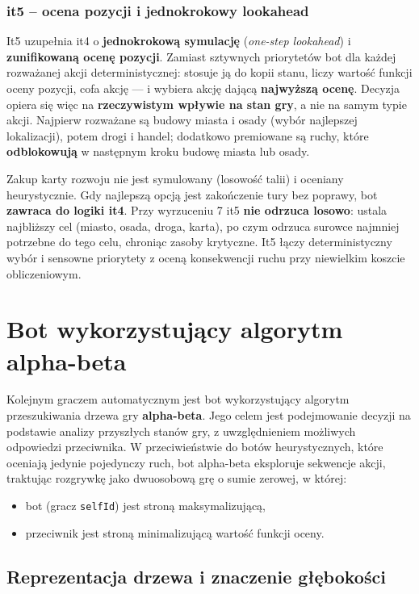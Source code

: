 \documentclass[polish,inz,longabstract]{iithesis}
\begin{document}
\subsubsection{it5 -- ocena pozycji i jednokrokowy lookahead}

It5 uzupełnia it4 o \textbf{jednokrokową symulację} (\emph{one-step lookahead}) i \textbf{zunifikowaną ocenę pozycji}. Zamiast sztywnych priorytetów bot dla każdej rozważanej akcji deterministycznej: stosuje ją do kopii stanu, liczy wartość funkcji oceny pozycji, cofa akcję --- i wybiera akcję dającą \textbf{najwyższą ocenę}. Decyzja opiera się więc na \textbf{rzeczywistym wpływie na stan gry}, a nie na samym typie akcji. Najpierw rozważane są budowy miasta i osady (wybór najlepszej lokalizacji), potem drogi i handel; dodatkowo premiowane są ruchy, które \textbf{odblokowują} w następnym kroku budowę miasta lub osady.

Zakup karty rozwoju nie jest symulowany (losowość talii) i oceniany heurystycznie. Gdy najlepszą opcją jest zakończenie tury bez poprawy, bot \textbf{zawraca do logiki it4}. Przy wyrzuceniu 7 it5 \textbf{nie odrzuca losowo}: ustala najbliższy cel (miasto, osada, droga, karta), po czym odrzuca surowce najmniej potrzebne do tego celu, chroniąc zasoby krytyczne. It5 łączy deterministyczny wybór i sensowne priorytety z oceną konsekwencji ruchu przy niewielkim koszcie obliczeniowym.

\section{Bot wykorzystujący algorytm alpha-beta}
\label{sec:alphabeta}

Kolejnym graczem automatycznym jest bot wykorzystujący algorytm przeszukiwania drzewa gry \textbf{alpha-beta}. Jego celem jest podejmowanie decyzji na podstawie analizy przyszłych stanów gry, z uwzględnieniem możliwych odpowiedzi przeciwnika. W przeciwieństwie do botów heurystycznych, które oceniają jedynie pojedynczy ruch, bot alpha-beta eksploruje sekwencje akcji, traktując rozgrywkę jako dwuosobową grę o sumie zerowej, w której:

\begin{itemize}
\item bot (gracz \texttt{selfId}) jest stroną maksymalizującą,
\item przeciwnik jest stroną minimalizującą wartość funkcji oceny.
\end{itemize}

\subsection{Reprezentacja drzewa i znaczenie głębokości}
\end{document}
